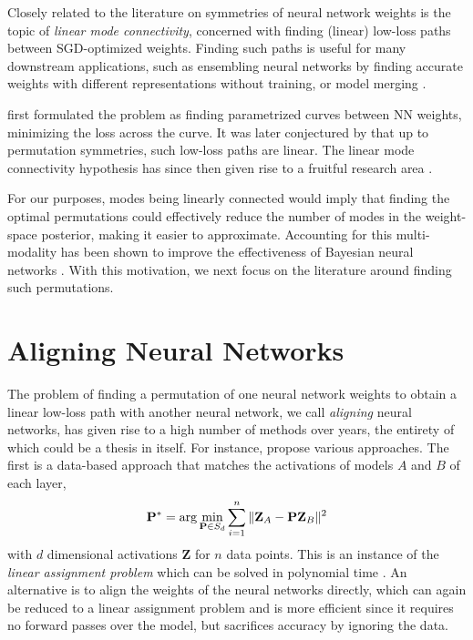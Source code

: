 Closely related to the literature on symmetries of neural network weights is the topic of \textit{linear mode connectivity}, concerned with finding (linear) low-loss paths between SGD-optimized weights. Finding such paths is useful for many downstream applications, such as ensembling neural networks \citep{garipovLossSurfacesMode2018a} by finding accurate weights with different representations without training, or model merging \citep{stoicaZipItMergingModels2024}.

\citet{garipovLossSurfacesMode2018a} first formulated the problem as finding parametrized curves between NN weights, minimizing the loss across the curve. It was later conjectured by \citet{entezariRolePermutationInvariance2022} that up to permutation symmetries, such low-loss paths are linear. The linear mode connectivity hypothesis has since then given rise to a fruitful research area \citep{ferbachProvingLinearMode2024,rossiPermutationSymmetriesBayesian2023,zhaoUnderstandingModeConnectivity2023}. 

For our purposes, modes being linearly connected would imply that finding the optimal permutations could effectively reduce the number of modes in the weight-space posterior, making it easier to approximate. Accounting for this multi-modality has been shown to improve the effectiveness of Bayesian neural networks \citep{sommerConnectingDotsModeConnectedness2024}. With this motivation, we next focus on the literature around finding such permutations. 

\section{Aligning Neural Networks}

The problem of finding a permutation of one neural network weights to obtain a linear low-loss path with another neural network, we call \textit{aligning} neural networks, has given rise to a high number of methods over years, the entirety of which could be a thesis in itself. For instance, \citep{ainsworthGitReBasinMerging2023} propose various approaches. The first is a data-based approach that matches the activations of models $A$ and $B$ of each layer,
\begin{equation}
    \mathbf{P}^* = \arg\min_{\mathbf{P} \in S_d} \sum_{i=1}^n \Vert \mathbf{Z}_A - \mathbf{P} \mathbf{Z}_B \Vert ^2
\end{equation}
with $d$ dimensional activations $\mathbf{Z}$ for $n$ data points. This is an instance of the \textit{linear assignment problem} which can be solved in polynomial time \citep{crouseImplementing2DRectangular2016}. An alternative is to align the weights of the neural networks directly, which can again be reduced to a linear assignment problem and is more efficient since it requires no forward passes over the model, but sacrifices accuracy by ignoring the data. 

